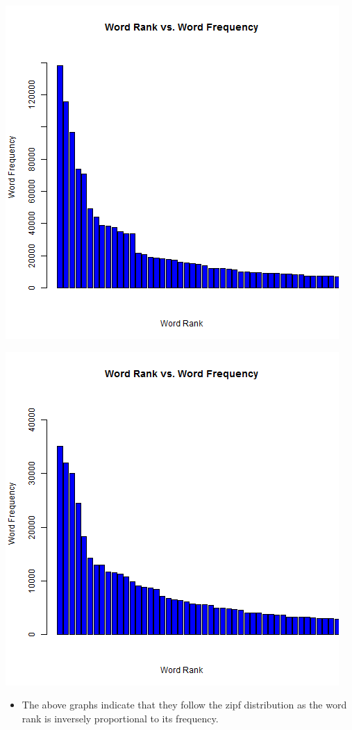 	\begin{minipage}{\linewidth}
		\centering
			\includegraphics[scale=0.55]{figures/beforeBP.png}
		\label{wordCount}
	\end{minipage}
	\begin{minipage}{\linewidth}
		\centering
			\includegraphics[scale=0.55]{figures/afterBP.png}
		\label{wordCount}
	\end{minipage}
\begin{itemize}
\item The above graphs indicate that they follow the zipf distribution as the word rank is inversely proportional to its frequency.
\end{itemize}

